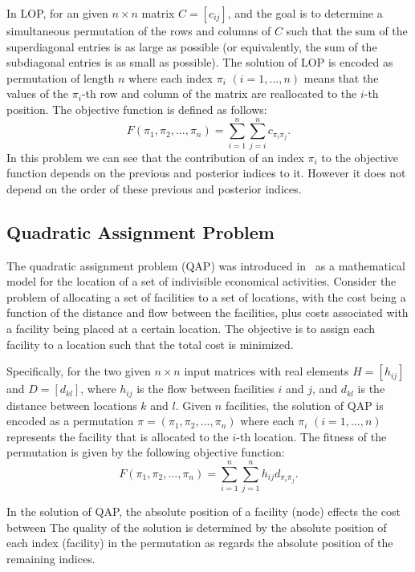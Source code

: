 In LOP, for an given $n\times n$ matrix $C=[c_{ij}]$, and the goal is to determine a simultaneous permutation of the rows and columns of $C$ such that the sum of the superdiagonal entries is as large as possible (or equivalently, the sum of the subdiagonal entries is as small as possible). The solution of LOP is encoded as permutation of length $n$ where each index $\pi_i$ $(i=1,...,n)$ means that the values of the $\pi_i$-th row and column of the matrix are reallocated to the $i$-th position. The objective function is defined as follows:
\begin{equation*}
	F(\pi_1, \pi_2, ... , \pi_n) = \sum^{n}_{i=1}\sum^{n}_{j=i}{ c_{\pi_i\pi_j} } \text{.}
\end{equation*}
In this problem we can see that the contribution of an index $\pi_i$ to the objective function depends on the previous and posterior indices to it. However it does not depend on the order of these previous and posterior indices.


\subsection{Quadratic Assignment Problem}
The quadratic assignment problem (QAP) was introduced in~\citep{koopmans1957assignment} as a mathematical model for the location of a set of indivisible economical activities. Consider the problem of allocating a set of facilities to a set of locations, with the cost being a function of the distance and flow between the facilities, plus costs associated with a facility being placed at a certain location. The objective is to assign each facility to a location such that the total cost is minimized.

Specifically, for the two given $n\times n$ input matrices with real elements $H=[h_{ij}]$ and $D=[d_{kl}]$, where $h_{ij}$ is the flow between facilities $i$ and $j$, and $d_{kl}$ is the distance between locations $k$ and $l$. Given $n$ facilities, the solution of QAP is encoded as a permutation $\pi = (\pi_1, \pi_2,...,\pi_n)$ where each $\pi_i$ $(i =1,...,n)$ represents the facility that is allocated to the $i$-th location. The fitness of the permutation is given by the following objective function:
\begin{equation*}
	F(\pi_1, \pi_2, ... , \pi_n) = \sum^{n}_{i=1}\sum^{n}_{j=1}{ h_{ij}d_{\pi_i\pi_j} } \text{.}
\end{equation*}

In the solution of QAP, the absolute position of a facility (node) effects the cost between 
The quality of the solution is determined by the absolute position of each index (facility) in the permutation as regards the absolute position of the remaining indices.


